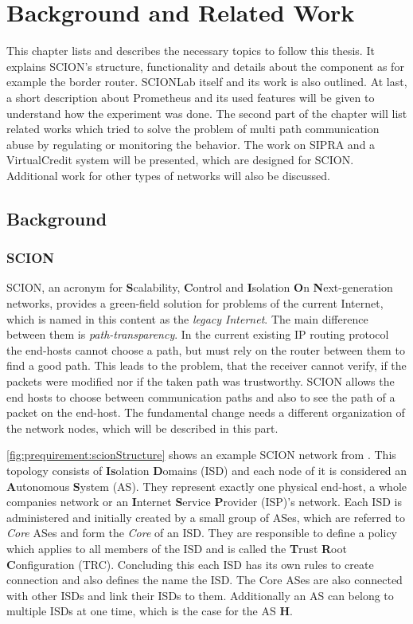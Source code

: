 \documentclass[thesis.tex]{subfiles}
\begin{document}
\chapter{Background and Related Work}  \label{chap:preqAndRel}

This chapter lists and describes the necessary topics to follow this thesis. It explains SCION's structure, functionality and details about the component as for example the border router. SCIONLab itself and its work is also outlined. At last, a short description about Prometheus and its used features will be given to understand how the experiment was done.
The second part of the chapter will list related works which tried to solve the problem of multi path communication abuse by regulating or monitoring the behavior. The work on SIPRA and a VirtualCredit system will be presented, which are designed for SCION. Additional work for other types of networks will also be discussed.

\section{Background} \label{chap:preq}

\subsection{SCION} \cite{SCIONPaper, SCIONBook}

SCION, an acronym for \textbf{S}calability, \textbf{C}ontrol and \textbf{I}solation \textbf{O}n \textbf{N}ext-generation networks, provides a green-field solution for problems of the current Internet, which is named in this content as the \textit{legacy Internet}. The main difference between them is \textit{path-transparency}. In the current existing IP routing protocol the end-hosts cannot choose a path, but must rely on the router between them to find a good path. This leads to the problem, that the receiver cannot verify, if the packets were modified nor if the taken path was trustworthy. SCION allows the end hosts to choose between communication paths and also to see the path of a packet on the end-host. The fundamental change needs a different organization of the network nodes, which will be described in this part.

\autoref{fig:prequirement:scionStructure} shows an example SCION network from \cite{SCIONPaper}. This topology consists of \textbf{Is}olation \textbf{D}omains (ISD) and each node of it is considered an \textbf{A}utonomous \textbf{S}ystem (AS). They represent exactly one physical end-host, a whole companies network or an \textbf{I}nternet \textbf{S}ervice \textbf{P}rovider (ISP)'s network. Each ISD is administered and initially created by a small group of ASes, which are referred to \textit{Core} ASes and form the \textit{Core} of an ISD. They are responsible to define a policy which applies to all members of the ISD and is called the \textbf{T}rust \textbf{R}oot \textbf{C}onfiguration (TRC). Concluding this each ISD has its own rules to create connection and also defines the name the ISD. The Core ASes are also connected with other ISDs and link their ISDs to them. Additionally an AS can belong to multiple ISDs at one time, which is the case for the AS \textbf{H}.
\end{document}
